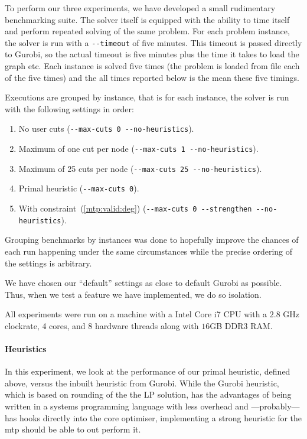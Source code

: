  To perform our three experiments, we have developed a small rudimentary benchmarking suite. The solver
 itself is equipped with the ability to time itself and perform repeated solving of the same problem.
 For each problem instance, the solver is run with a \texttt{-{}-timeout} of five minutes. This timeout
 is passed directly to Gurobi, so the actual timeout is five minutes plus the time it takes to load the
 graph etc. Each instance is solved five times (the problem is loaded from file each of the five times)
 and the all times reported below is the mean these five timings.

 Executions are grouped by instance, that is for each instance, the solver is run with the following
 settings in order:
 \begin{enumerate}
 \item No user cuts (\texttt{-{}-max-cuts 0 -{}-no-heuristics}).
 \item Maximum of one cut per node (\texttt{-{}-max-cuts 1 -{}-no-heuristics}).
 \item Maximum of 25 cuts per node (\texttt{-{}-max-cuts 25 -{}-no-heuristics}).
 \item Primal heuristic (\texttt{-{}-max-cuts 0}).
 \item With constraint~(\ref{mtp:valid:deg}) (\texttt{-{}-max-cuts 0 -{}-strengthen -{}-no-heuristics}).
 \end{enumerate}
 Grouping benchmarks by instances was done to hopefully improve the chances of each run happening
 under the same circumstances while the precise ordering of the settings is arbitrary.

 We have chosen our ``default'' settings as close to default Gurobi as possible. Thus, when we test
 a feature we have implemented, we do so isolation.
 
 All experiments were run on a machine with a Intel Core i7 CPU with a $2.8$ GHz clockrate, 4
 cores, and 8 hardware threads along with $16$GB DDR3 RAM.

\paragraph{Heuristics}
In this experiment, we look at the performance of our primal heuristic, defined above, versus
the inbuilt heuristic from Gurobi. While the Gurobi heuristic, which is based on rounding
of the the LP solution, has the advantages of being written in a systems programming language
with less overhead and ---probably--- has hooks directly into the core optimiser,
implementing a strong heuristic for the \gls{mtp} should be able to out perform it.

